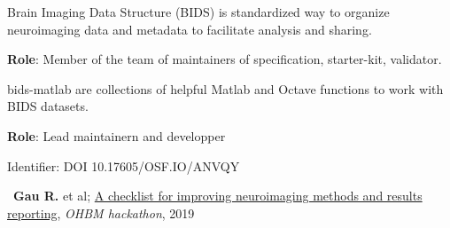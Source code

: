 

Brain Imaging Data Structure (BIDS) is standardized way to organize neuroimaging data and metadata to facilitate analysis and sharing.
    
\textbf{Role}: Member of the team of maintainers of specification, starter-kit, validator.



    
bids-matlab are collections of helpful Matlab and Octave functions to work with BIDS datasets.
    
\textbf{Role}: Lead maintainern and developper

    

   
Identifier: DOI 10.17605/OSF.IO/ANVQY

\textbullet~\textbf{Gau R.} et al; 
\href{https://github.com/ohbm/hackathon2019/issues/49}{A checklist for improving neuroimaging methods and results reporting}, \textit{OHBM hackathon}, 2019




    



